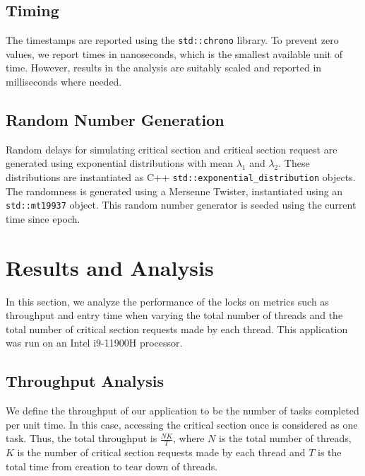 \documentclass[conference,compsoc]{IEEEtran}
\begin{document}
\subsection{Timing}
\label{subsec:timing}

The timestamps are reported using the \texttt{std::chrono} library. To prevent
zero values, we report times in nanoseconds, which is the smallest available
unit of time. However, results in the analysis are suitably scaled and reported
in milliseconds where needed.

\subsection{Random Number Generation}
\label{subsec:rng}

Random delays for simulating critical section and critical section request are
generated using exponential distributions with mean \(\lambda_1\) and
\(\lambda_2\). These distributions are instantiated as C++
\texttt{std::exponential\_distribution} objects. The randomness is generated
using a Mersenne Twister, instantiated using an \texttt{std::mt19937} object.
This random number generator is seeded using the current time since epoch.

\section{Results and Analysis}
\label{sec:results}

In this section, we analyze the performance of the locks on metrics such as
throughput and entry time when varying the total number of threads and the total
number of critical section requests made by each thread. This application was
run on an Intel i9-11900H processor.

\subsection{Throughput Analysis}
\label{subsec:throughput}

We define the throughput of our application to be the number of tasks completed
per unit time. In this case, accessing the critical section once is considered
as one task. Thus, the total throughput is \(\frac{NK}{T}\), where \(N\) is the
total number of threads, \(K\) is the number of critical section requests made
by each thread and \(T\) is the total time from creation to tear down of
threads.
\end{document}
